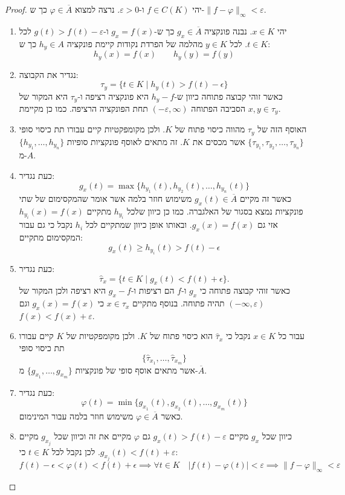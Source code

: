 \documentclass{tstextbook}
\begin{document}
\begin{proof}
יהי \(f \in C(K)\) ו-\(\varepsilon> 0\). נרצה למצוא \(\varphi \in \overline{A}\) כך ש-\(\lVert f-\varphi \rVert_{\infty}<\varepsilon\).

  \begin{enumerate}
    \item יהי \(x \in K\). נבנה פונקציה \(g_{x}\in \overline{A}\) כך ש-\(g_{x}=f(x)\) ו-\(g(t)>f(t)-\varepsilon\) לכל \(t \in K\). לכל \(y\in K\) מהלמה של הפרדת נקודות קיימת פונקציה \(h_{y}\in A\) כך ש: 
$$h_{y}(x)=f(x)\qquad h_{y}(y)=f(y)$$


    \item נגדיר את הקבוצה: 
$$\tau_{y}=\{t\in K\mid h_{y}(t)>f(t)-\epsilon\}$$
כאשר זוהי קבוצה פתוחה כיוון ש-\(h_{y}-f\) היא פונקציה רציפה ו-\(\tau_{y}\) היא המקור של הסביבה הפתוחה \((-\varepsilon,\infty)\) תחת הפונקציה הרציפה. כמו כן מקיימת \(x ,y \in \tau_{y}\).


    \item האוסף הזה של \(\tau_{y}\) מהווה כיסוי פתוח של \(K\). ולכן מקומפקטיות קיים עבורו תת כיסוי סופי \(\{ \tau_{y_{1}},\tau_{y_{2}},\dots,\tau_{y_{n}} \}\) אשר מכסים את \(K\). זה מתאים לאוסף פונקציות סופיות \(\{ h_{y_{1}},\dots,h_{y_{n}} \}\) מ-\(A\). 


    \item כעת נגדיר: 
$$g_{x}(t)=\operatorname*{max}\{h_{y_{1}}(t),h_{y_{2}}(t),\ldots,h_{y_{n}}(t)\}$$
כאשר זה מקיים \(g_{x}(t)\in \overline{A}\) משימוש חוזר בלמה אשר אומר שהמקסימום של שתי פונקציות נמצא בסגור של האלגברה. כמו כן כיוון שלכל \(h_{y_{i}}\) מתקיים \(h_{y_{i}}(x)=f(x)\) אזי גם \(g_{x}(x)=f(x)\). ובאותו אופן כיוון שמתקיים לכל \(h_{i}\) נקבל כי גם עבור המקסימום מתקיים:
$$g_{x}(t)\geq h_{y_{i}}(t)>f(t)-\epsilon$$


    \item כעת נגדיר: 
$${\hat{\tau}}_{x}=\{t\in K\mid g_{x}(t)<f(t)+\epsilon\}.$$
כאשר זוהי קבוצה פתוחה כי \(g_{x}\) ו-\(f\) הם רציפות ו-\(g_{x}-f\) היא רציפה ולכן המקור של \((-\infty,\varepsilon)\) תהיה פתוחה. בנוסף מתקיים \(x \in \hat{\tau}_{x}\) כי \(g_{x}(x)=f(x)\) וגם \(f(x)<f(x)+\varepsilon\). 


    \item עבור כל \(x \in K\) נקבל כי \(\hat{\tau}_{x}\) הוא כיסוי פתוח של \(K\). ולכן מקומפקטיות של \(K\) קיים עבורו תת כיסוי סופי 
$$\{ \hat{\tau}_{x_{1}},\dots,\hat{\tau}_{x_{m}} \}$$
אשר מתאים אוסף סופי של פונקציות \(\{ g_{x_{1}},\dots,g_{x_{m}} \}\) מ-\(\overline{A}\).


    \item כעת נגדיר: 
$$\varphi(t)=\operatorname*{min}\{g_{x_{1}}(t),g_{x_{2}}(t),\ldots,g_{x_{m}}(t)\}$$
כאשר \(\varphi \in \overline{A}\) משימוש חוזר בלמה עבור המינימום.


    \item כיוון שכל \(g_{x}\) מקיים \(g_{x}(t)>f(t)-\varepsilon\) גם \(\varphi\) מקיים את זה וכיוון שכל \(g_{x_{j}}\) מקיים \(g_{x_{j}}(t)<f(t)+\varepsilon\). לכן נקבל לכל \(t \in K\) כי: 
$$f(t)-\epsilon<\varphi(t)<f(t)+\epsilon\implies \forall t \in K\quad |f(t)-\varphi(t)|<\varepsilon\implies \lVert f-\varphi \rVert _{\infty}<\varepsilon$$


  \end{enumerate}
\end{proof}
\end{document}
